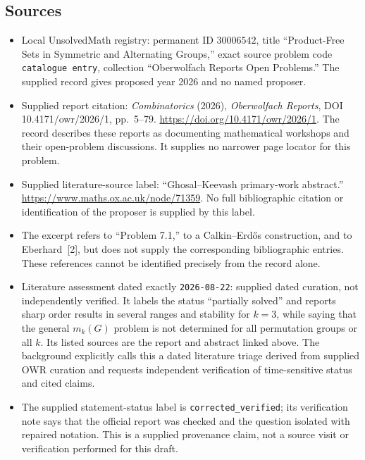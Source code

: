 \documentclass[11pt]{article}
\begin{document}
\subsection{Sources}
\begin{itemize}
\item Local UnsolvedMath registry: permanent ID \(30006542\), title ``Product-Free Sets in Symmetric and Alternating Groups,'' exact source problem code \texttt{catalogue entry}, collection ``Oberwolfach Reports Open Problems.'' The supplied record gives proposed year 2026 and no named proposer.
\item Supplied report citation: \emph{Combinatorics} (2026), \emph{Oberwolfach Reports}, DOI 10.4171/owr/2026/1, pp.~5--79. \url{https://doi.org/10.4171/owr/2026/1}. The record describes these reports as documenting mathematical workshops and their open-problem discussions. It supplies no narrower page locator for this problem.
\item Supplied literature-source label: ``Ghosal--Keevash primary-work abstract.'' \url{https://www.maths.ox.ac.uk/node/71359}. No full bibliographic citation or identification of the proposer is supplied by this label.
\item The excerpt refers to ``Problem 7.1,'' to a Calkin--Erd\H{o}s construction, and to Eberhard~[2], but does not supply the corresponding bibliographic entries. These references cannot be identified precisely from the record alone.
\item Literature assessment dated exactly \texttt{2026-08-22}: supplied dated curation, not independently verified. It labels the status ``partially solved'' and reports sharp order results in several ranges and stability for \(k=3\), while saying that the general \(m_k(G)\) problem is not determined for all permutation groups or all \(k\). Its listed sources are the report and abstract linked above. The background explicitly calls this a dated literature triage derived from supplied OWR curation and requests independent verification of time-sensitive status and cited claims.
\item The supplied statement-status label is \texttt{corrected\_verified}; its verification note says that the official report was checked and the question isolated with repaired notation. This is a supplied provenance claim, not a source visit or verification performed for this draft.
\end{itemize}
\end{document}

